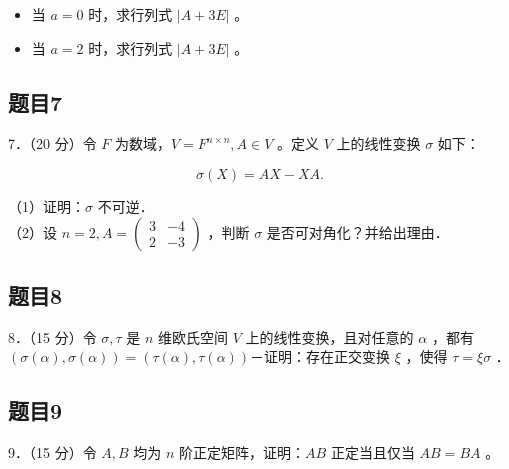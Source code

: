 \documentclass{article}
\begin{document}
\begin{itemize}
  \item[（1）] 当 \(a=0\) 时，求行列式 \(|A+3 E|\) 。
  \item[（2）] 当 \(a=2\) 时，求行列式 \(|A+3 E|\) 。
\end{itemize}

\subsection{题目7}
7．（20 分）令 \(F\) 为数域，\(V=F^{n \times n}, A \in V\) 。定义 \(V\) 上的线性变换 \(\sigma\) 如下：

\[
\sigma(X)=A X-X A .
\]

（1）证明：\(\sigma\) 不可逆．\\
（2）设 \(n=2, A=\left(\begin{array}{ll}3 & -4 \\ 2 & -3\end{array}\right)\) ，判断 \(\sigma\) 是否可对角化？并给出理由．

\subsection{题目8}
8．（15 分）令 \(\sigma, \tau\) 是 \(n\) 维欧氏空间 \(V\) 上的线性变换，且对任意的 \(\alpha\) ，都有 \((\sigma(\alpha), \sigma(\alpha))=(\tau(\alpha), \tau(\alpha))\)－证明：存在正交变换 \(\xi\) ，使得 \(\tau=\xi \sigma\) ．

\subsection{题目9}
9．（15 分）令 \(A, B\) 均为 \(n\) 阶正定矩阵，证明：\(A B\) 正定当且仅当 \(A B=B A\) 。
\end{document}
